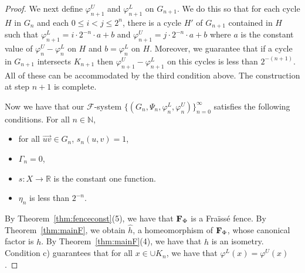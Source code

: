 \documentclass[11pt]{amsart}
\newcommand{\N}{\mathbb{N}}  %
\newcommand{\R}{\mathbb{R}}  %
\newcommand{\oa}{\overrightarrow}
\newcommand{\fence}{{\bf F}_{\Phi}{}}
\newcommand{\cF}{\mathcal{F}}
\newcommand{\fsystem}{\{(G_n, \Psi_n,\varphi^L_n,\varphi^U_n)\}_{n=0}^{\infty}}
\begin{document}
{\begin{proof}
 We next define $\varphi_{n+1}^U$ and $\varphi_{n+1}^L$ on $G_{n+1}$. We do this so that for each cycle $H$ in $G_n$ and each $0 \le i < j \le 2^n$, there is a cycle $H'$ of $G_{n+1}$ contained in $H$ such that $\varphi_{n+1}^L = i\cdot 2^{-n} \cdot a +b  $ and $\varphi_{n+1}^U  = j \cdot 2^{-n} \cdot a+b$ where $a$ is the constant value of $\varphi_n^U - \varphi_n^L$ on $H$ and $b = \varphi_n^L $ on $H$. Moreover,
 we guarantee that if a cycle in $G_{n+1}$ intersects $K_{n+1}$ then $\varphi_{n+1}^U - \varphi_{n+1}^L$ on this cycles is less than $2^{-(n+1)}$. All of these can be accommodated by the third condition above. The construction at step $n+1$ is complete. 

 Now we have that our $\cF$-system $\fsystem$ satisfies the following conditions. For all $n \in \N$,
 \begin{itemize}
     \item for all $\oa{uv} \in G_n$, $s_n(u,v) =1$,
     \item $\Gamma_n =0$,
     \item $s:X \rightarrow \R$ is the constant one function.
     \item  $\eta_n$ is less than $2^{-n}$.
 \end{itemize}
By Theorem~\ref{thm:fenceconst}(5), we have that $\fence$ is a Fra\"iss\'e fence. By Theorem~\ref{thm:mainF}, we obtain $\hat{h}$, a homeomorphism of $\fence$, whose canonical factor is $h$. By Theorem~\ref{thm:mainF}(4), we have that $\hat{h}$ is an isometry. Condition c) guarantees that for all $x \in \cup K_n$, we have that $\varphi^L(x) = \varphi^U (x)$. 
\end{proof}

}
\end{document}
